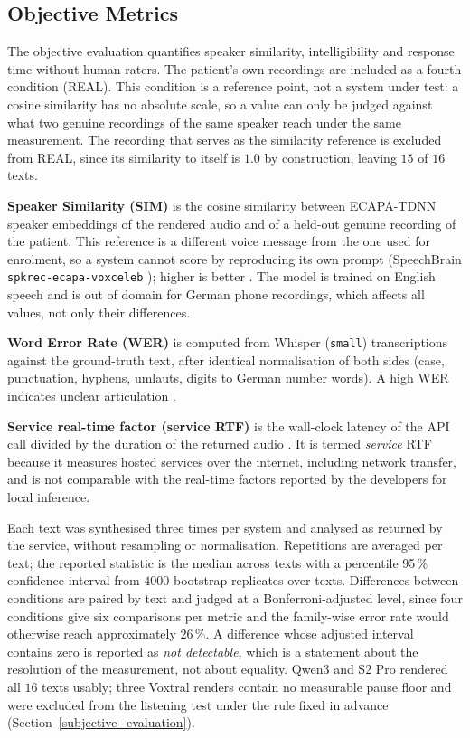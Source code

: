 \subsection{Objective Metrics}
\label{objective_metrics}

The objective evaluation quantifies speaker similarity, intelligibility and
response time without human raters. The patient's own recordings are included
as a fourth condition (REAL). This condition is a reference point, not a system
under test: a cosine similarity has no absolute scale, so a value can only be
judged against what two genuine recordings of the same speaker reach under the
same measurement. The recording that serves as the similarity reference is
excluded from REAL, since its similarity to itself is $1.0$ by construction,
leaving $15$ of $16$ texts.

\textbf{Speaker Similarity (SIM)} is the cosine similarity between ECAPA-TDNN
speaker embeddings \cite{desplanques2020ecapa} of the rendered audio and of a
held-out genuine recording of the patient. This reference is a different voice
message from the one used for enrolment, so a system cannot score by
reproducing its own prompt (SpeechBrain \texttt{spkrec-ecapa-voxceleb}
\cite{ravanelli2021speechbrain}); higher is better
\cite{du2025cosyvoice3inthewildspeech}. The model is trained on English speech
and is out of domain for German phone recordings, which affects all values, not
only their differences.

\textbf{Word Error Rate (WER)} is computed from Whisper \cite{radford2023whisper}
(\texttt{small}) transcriptions against the ground-truth text, after identical
normalisation of both sides (case, punctuation, hyphens, umlauts, digits to
German number words). A high WER indicates unclear articulation
\cite{du2025cosyvoice3inthewildspeech}.

\textbf{Service real-time factor (service RTF)} is the wall-clock latency of the
API call divided by the duration of the returned audio
\cite{achanta2021ondeviceneuralspeechsynthesis}. It is termed \emph{service}
RTF because it measures hosted services over the internet, including network
transfer, and is not comparable with the real-time factors reported by the
developers for local inference.

Each text was synthesised three times per system and analysed as returned by
the service, without resampling or normalisation. Repetitions are averaged per
text; the reported statistic is the median across texts with a percentile
95\,\% confidence interval from $4000$ bootstrap replicates over texts.
Differences between conditions are paired by text and judged at a
Bonferroni-adjusted level, since four conditions give six comparisons per
metric and the family-wise error rate would otherwise reach approximately
$26\,\%$. A difference
whose adjusted interval contains zero is reported as \emph{not detectable},
which is a statement about the resolution of the measurement, not about
equality. Qwen3 and S2 Pro rendered all $16$ texts usably; three Voxtral
renders contain no measurable pause floor and were excluded from the listening
test under the rule fixed in advance (Section~\ref{subjective_evaluation}).

